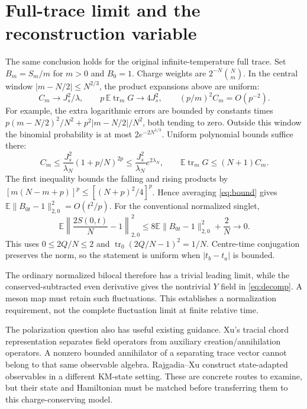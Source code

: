 \documentclass[11pt,a4paper]{article}
\newcommand{\EE}{\mathbb E}
\newcommand{\trm}{\operatorname{tr}_m}
\DeclareMathOperator{\tr}{tr}
\begin{document}
\newpage
\section{Full-trace limit and the reconstruction variable}
The same conclusion holds for the original infinite-temperature full
trace. Set $B_m=S_m/m$ for $m>0$ and $B_0=1$. Charge weights are
$2^{-N}\binom Nm$. In the central window
$|m-N/2|\leq N^{2/3}$, the product expansions above are uniform:
\begin{equation}
 C_m\to J_s^2/\lambda,\qquad
 p\,\EE\trm G\to4J_s^2,\qquad (p/m)^2C_m=O(p^{-2}).
\end{equation}
For example, the extra logarithmic errors are bounded by constants
times $p(m-N/2)^2/N^2+p^2|m-N/2|/N^2$, both tending to zero.
Outside this window the binomial probability is at most
$2e^{-2N^{1/3}}$. Uniform polynomial bounds suffice there:
\begin{equation}
 C_m\leq\frac{J_s^2}{\lambda_N}(1+p/N)^{2p}
 \leq\frac{J_s^2}{\lambda_N}e^{2\lambda_N},\qquad
 \EE\trm G\leq(N+1)C_m.
\end{equation}
The first inequality bounds the falling and rising products by
$[m(N-m+p)]^p\leq[(N+p)^2/4]^p$.
Hence averaging \eqref{eq:bound} gives
$\EE\|B_{0t}-1\|_{2,0}^2=O(t^2/p)$.
For the conventional normalized singlet,
\begin{equation}
 \EE\left\|\frac{2S(0,t)}N-1\right\|_{2,0}^2
 \leq8\EE\|B_{0t}-1\|_{2,0}^2+\frac2N
 \longrightarrow0.
\end{equation}
This uses $0\leq2Q/N\leq2$ and
$\tr_0(2Q/N-1)^2=1/N$. Centre-time conjugation preserves the norm,
so the statement is uniform when $|t_b-t_a|$ is bounded.

The ordinary normalized bilocal therefore has a trivial leading
limit, while the conserved-subtracted even derivative gives the
nontrivial $Y$ field in \eqref{eq:decomp}. A meson map must retain
such fluctuations. This establishes a normalization requirement,
not the complete fluctuation limit at finite relative time.

The polarization question also has useful existing guidance.
Xu's tracial chord representation \cite{Xu} separates field operators
from auxiliary creation/annihilation operators. A nonzero bounded
annihilator of a separating trace vector cannot belong to that same
observable algebra. Rajgadia--Xu \cite{RX} construct state-adapted
observables in a different KM-state setting. These are concrete
routes to examine, but their state and Hamiltonian must be matched
before transferring them to this charge-conserving model.
\end{document}

